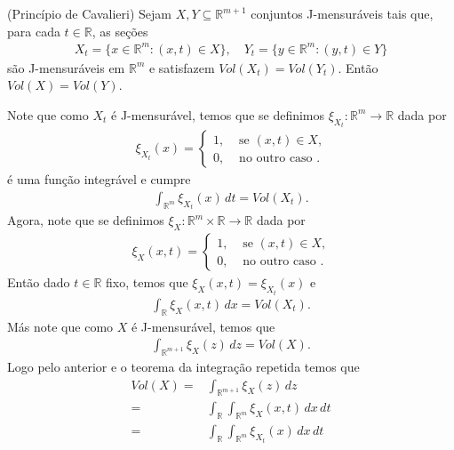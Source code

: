 \begin{homeworkProblem}[Seção 4-4]
  (Princípio de Cavalieri) Sejam $X,Y\subseteq \mathbb{R}^{m+1}$ conjuntos J-mensuráveis tais que, para cada $t\in\mathbb{R}$, as seções
  \begin{align*}
    X_{t}=\{x\in\mathbb{R}^{m}:(x,t)\in X\},\quad Y_t=\{y\in\mathbb{R}^{m}:(y,t)\in Y\}
  \end{align*}
  são J-mensuráveis em $\mathbb{R}^{m}$ e satisfazem $Vol(X_t)=Vol(Y_t)$. Então $Vol(X)=Vol(Y)$. 
  \begin{solution}
    Note que como $X_t$ é J-mensurável, temos que se definimos $\xi_{X_t}:\mathbb{R}^{m}\to\mathbb{R}$ dada por
    \begin{align*}
      \xi_{X_t}(x)=\begin{cases}
        1, &\text{ se } (x,t)\in X \text{,} \\
        0, &\text{ no outro caso }.
      \end{cases}
    \end{align*}
    é uma função integrável e cumpre
    \begin{align*}
      \int_{\mathbb{R}^{m}}\xi_{X_{t}}(x)\,dt=Vol(X_t).
    \end{align*}
    Agora, note que se definimos $\xi_{X}:\mathbb{R}^{m}\times\mathbb{R}\to\mathbb{R}$ dada por 
    \begin{align*}
      \xi_{X}(x,t)=\begin{cases}
        1, &\text{ se } (x,t)\in X \text{,} \\
        0, &\text{ no outro caso }.
      \end{cases}
    \end{align*}
    Então dado $t\in\mathbb{R}$ fixo, temos que $\xi_{X}(x,t)=\xi_{X_t}(x)$ e
    \begin{align*}
      \int_{\mathbb{R}}\xi_{X}(x,t)\,dx=Vol(X_t).
    \end{align*}
    Más note que como $X$ é J-mensurável, temos que
    \begin{align*}
      \int_{\mathbb{R}^{m+1}}\xi_{X}(z)\,dz=Vol(X).
    \end{align*}
    Logo pelo anterior e o teorema da integração repetida temos que
    \begin{align*}
      Vol(X)=&\int_{\mathbb{R}^{m+1}}\xi_{X}(z)\,dz\\
      =&\int_{\mathbb{R}}\int_{\mathbb{R}^{m}}\xi_{X}(x,t)\,dx\,dt\\
      =&\int_{\mathbb{R}}\int_{\mathbb{R}^{m}}\xi_{X_t}(x)\,dx\,dt\\

\end{align*}
\end{solution}
\end{homeworkProblem}
